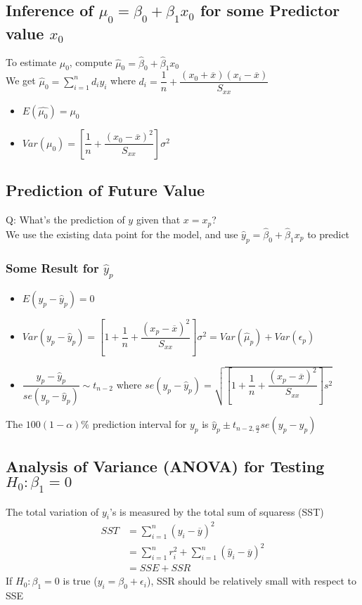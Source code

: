 \documentclass[11pt]{article}
\begin{document}
\subsection{Inference of $\mu_0=\beta_0+\beta_1x_0$ for some Predictor value $x_0$}
To estimate $\mu_0$, compute $\hat{\mu}_0=\hat{\beta}_0+\hat{\beta}_1x_0$ \\
We get $\hat{\mu}_0=\sum_{i=1}^{n}d_iy_i$ where $d_i = \dfrac{1}{n}+\dfrac{(x_0+\overline{x})(x_i-\overline{x})}{S_{xx}}$
\begin{itemize}
    \item $E(\hat{\mu_0})=\mu_0$
    \item $Var(\hat{\mu_0})=[\dfrac{1}{n}+\dfrac{(x_0-\overline{x})^2}{S_{xx}}]\sigma^2$
\end{itemize}
\subsection{Prediction of Future Value}
Q: What's the prediction of $y$ given that $x=x_p$? \\
We use the existing data point for the model, and use $\hat{y}_p=\hat{\beta}_0+\hat{\beta}_1x_p$ to predict 
\subsubsection*{Some Result for $\hat{y}_p$}
\begin{itemize}
    \item $E(y_p-\hat{y}_p)=0$
    \item $Var(y_p-\hat{y}_p)=[1+\dfrac{1}{n}+\dfrac{(x_p-\overline{x})^2}{S_{xx}}]\sigma^2 = Var(\hat{\mu}_p)+Var(\epsilon_p)$
    \item $\dfrac{y_p-\hat{y}_p}{se(y_p-\hat{y}_p)}\sim t_{n-2}$ where $se(y_p-\hat{y}_p)=\sqrt{[1+\dfrac{1}{n}+\dfrac{(x_p-\overline{x})^2}{S_{xx}}]s^2}$
\end{itemize}
The $100(1-\alpha)\%$ prediction interval for $y_p$ is $\hat{y}_p\pm t_{n-2,\frac{\alpha}{2}}se(y_p-\hat{y}_p)$
\subsection{Analysis of Variance (ANOVA) for Testing $H_0:\beta_1=0$}
The total variation of $y_i$'s is measured by the total sum of squaress (SST)
\begin{align*}
    SST&=\sum_{i=1}^{n}(y_i-\overline{y})^2 \\
       &=\sum_{i=1}^{n}r_i^2 + \sum_{i=1}^{n}(\hat{y}_i-\overline{y})^2 \\
       &= SSE + SSR 
\end{align*}
If $H_0: \beta_1=0$ is true ($y_i=\beta_0+\epsilon_i$), SSR should be relatively small with respect to SSE \\
\end{document}
